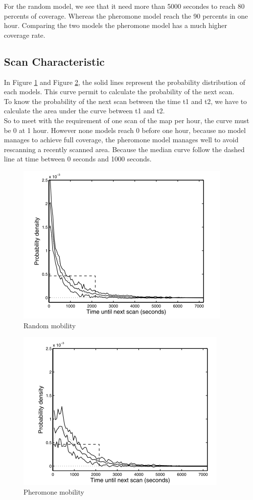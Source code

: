 For the random model, we see that it need more than 5000 secondes to reach 80 percents of coverage. Whereas the pheromone model reach the 90 percents in one hour. Comparing the two models the pheromone model has a much higher coverage rate.
\newpage
\subsection{Scan Characteristic}

In Figure \ref{randomchar} and Figure \ref{pheromonechar}, the solid lines represent the probability distribution of each models. This curve permit to calculate the probability of the next scan.\\ To know the probability of the next scan between the time t1 and t2, we have to calculate the area under the curve between t1 and t2.\\
So to meet with the requirement of one scan of the map per hour, the curve must be 0 at 1 hour. However none models reach 0 before one hour, because no model manages to achieve full coverage, the pheromone model manages well to avoid rescanning a recently scanned area. Because the median curve follow the dashed line at time between 0 seconds and 1000 seconds.

\begin{figure}[h]
\caption{\label{randomchar} Random mobility}
   \includegraphics{../images/random_scan_characteristic.png}
\end{figure}

\begin{figure}[h]
\caption{\label{pheromonechar} Pheromone mobility}
   \includegraphics{../images/pheromone_scan_characteristic.png}
\end{figure}




